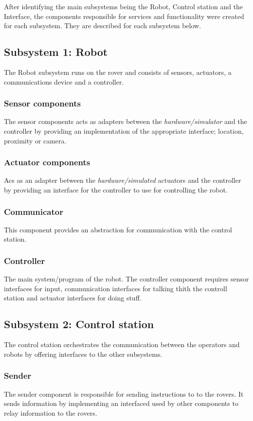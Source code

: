 After identifying the main subsystems being the Robot, Control station and the Interface, the components responsible for services and functionality were created for each subsystem. They are described for each subsystem below.
\subsection*{Subsystem 1: Robot}
The Robot subsystem runs on the rover and consists of sensors, actuators, a communications device and a controller.
\subsubsection*{Sensor components}
The sensor components acts as adapters between the \emph{hardware/simulator} and the controller by providing  an implementation of the appropriate interface; location, proximity or camera.
\subsubsection*{Actuator components}
Acs as an adapter between the \emph{hardware/simulated} actuators and the controller by providing an interface for the controller to use for controlling the robot.

\subsubsection*{Communicator}
This component provides an abstraction for communication with the control station.

\subsubsection*{Controller}
The main system/program of the robot. The controller component requires sensor interfaces for input, communication interfaces for talking thith the controll station and actuator interfaces for doing stuff.

\subsection*{Subsystem 2: Control station}
The control station orchestrates the communication between the operators and robots by offering interfaces to the other subsystems.
\subsubsection*{Sender}
The sender component is responsible for sending instructions to to the rovers. It sends information by implementing an interfaced used by other components to relay information to the rovers.
